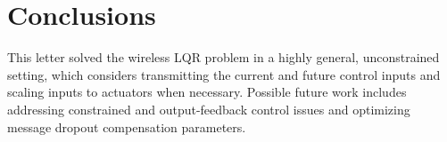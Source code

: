 \documentclass[letterpaper, 10 pt, conference]{ieeeconf}  %
\begin{document}
\section{Conclusions}\label{sec:conclusions}
This letter solved the wireless LQR %
problem in a highly general, unconstrained setting, which considers transmitting the current and future control inputs and scaling inputs to actuators when necessary. Possible future work includes addressing constrained and output-feedback control issues and optimizing message dropout compensation parameters.



\end{document}
